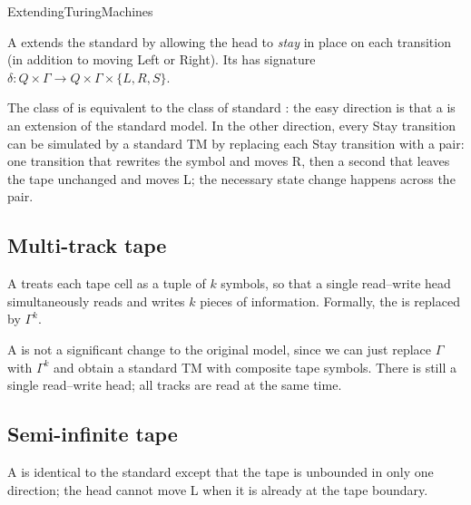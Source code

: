 \documentclass[hidelinks]{article}
\begin{document}
\begin{smodule}[title={Extending Turing Machine Definitions}]{ExtendingTuringMachines}
\begin{sdefinition}[for=stay-option Turing machine]
A  extends the standard  by allowing the head to \emph{stay} in place on each transition (in addition to moving Left or Right). Its  has signature $\delta : Q \times \Gamma \to Q \times \Gamma \times \{L, R, S\}$.
\end{sdefinition}

The class of  is equivalent to the class of standard : the easy direction is that a  is an extension of the standard model. In the other direction, every Stay transition can be simulated by a standard TM by replacing each Stay transition with a pair: one transition that rewrites the symbol and moves R, then a second that leaves the tape unchanged and moves L; the necessary state change happens across the pair.

\subsection{Multi-track tape}

\begin{sdefinition}[for=multi-track Turing machine]
A  treats each tape cell as a tuple of $k$  symbols, so that a single read--write head simultaneously reads and writes $k$ pieces of information. Formally, the  is replaced by $\Gamma^k$.
\end{sdefinition}

A  is not a significant change to the original model, since we can just replace $\Gamma$ with $\Gamma^k$ and obtain a standard TM with composite tape symbols. There is still a single read--write head; all tracks are read at the same time.

\subsection{Semi-infinite tape}

\begin{sdefinition}[for=semi-infinite tape Turing machine]
A  is identical to the standard  except that the tape is unbounded in only one direction; the head cannot move L when it is already at the tape boundary.
\end{sdefinition}


\end{smodule}
\end{document}
